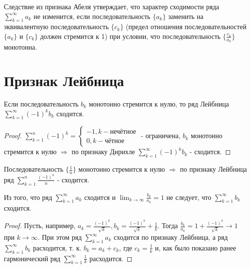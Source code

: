 	\begin{mention}
		Следствие из признака Абеля утверждает, что характер
		сходимости ряда $\sum_{k = 1}^{\infty} {a_k}$ не изменится, если последовательность $\{a_k\}$ заменить на эквивалентную последовательность $\{c_k\}$ (предел отношения последовательностей $\{a_k\}$ и $\{c_k\}$ должен стремится к 1) при условии, что последовательность $\{\frac{c_k}{a_k}\}$ монотонна.
	\end{mention}
	
	\section{Признак Лейбница}
	
	\begin{theorem}
		Если последовательность ${b_k}$ монотонно стремится к нулю, то
		ряд Лейбница $\displaystyle \sum_{k = 1}^{\infty} (-1)^k b_k$ сходится.
	\end{theorem}

	\begin{proof}
		$\sum_{k = 1}^n (-1)^k = \left\{{
			\begin{matrix} 
			-1, k - \text{нечётное} \\
			0, k - \text{чётное}
		\end{matrix}
		}\right.$ - ограничена, ${b_k}$ монотонно стремится к нулю  $\Rightarrow$ по признаку Дирихле $\sum_{k = 1}^{\infty} (-1)^k b_k$ - сходится.
	\end{proof}
	
	\begin{example}
		Последовательность $\{\frac{1}{n}\}$ монотонно стремится к нулю $\Rightarrow$ по признаку Лейбница ряд $\sum_{k = 1}^n \frac{(-1)^n}{n}$ - сходится.
	\end{example}
	
	\begin{mention}
		Из того, что ряд $\displaystyle \sum_{k = 1}^{\infty} {a_k}$ сходится и $\displaystyle \lim_{k \to \infty} {\frac{b_k}{a_k}} = 1$ не следует, что $\displaystyle \sum_{k = 1}^{\infty} {b_k}$ сходится.
	\end{mention}
	
	\begin{proof}
		Пусть, например, $a_k = \frac{(-1)^k}{\sqrt{k}}, b_k = \frac{(-1)^k}{\sqrt{k}} + \frac{1}{k}$. Тогда $\frac{b_k}{a_k} = 1 + \frac{(-1)^k}{\sqrt{k}} \rightarrow 1$ при $k \rightarrow \infty$. При этом ряд $\sum_{k = 1}^{\infty} a_k$ сходится по признаку Лейбница, а ряд $\sum_{k = 1}^{\infty} b_k$ расходится, т. к. $b_k = a_k + c_k$, где $c_k = \frac{1}{k}$ и, как было показано ранее гармонический ряд $\sum_{k = 1}^{\infty} \frac{1}{k}$ расходится.
	\end{proof}
	
